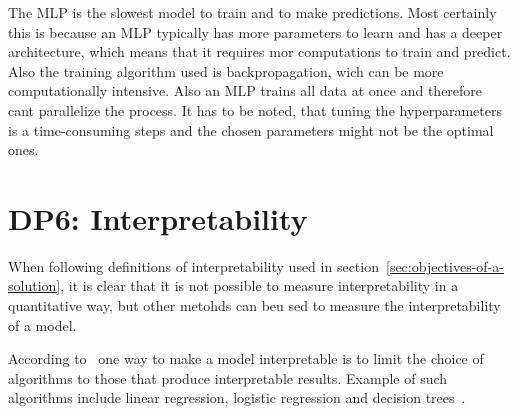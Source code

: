The \ac{MLP} is the slowest model to train and to make predictions.
Most certainly this is because an \ac{MLP} typically has more parameters to learn and
has a deeper architecture, which means that it requires mor computations to train and
predict.
Also the training algorithm used is backpropagation, wich can be more computationally
intensive.
Also an \ac{MLP} trains all data at once and therefore cant parallelize the process.
It has to be noted, that tuning the hyperparameters is a time-consuming steps and the
chosen parameters might not be the optimal ones.


\section{DP6: Interpretability}\label{sec:interpretability}

When following definitions of interpretability used in
section~\ref{sec:objectives-of-a-solution}, it is clear that it is not possible to
measure interpretability in a quantitative way, but other metohds can beu sed to measure the
interpretability of a model.


According to~\cite{molnar2020interpretable} one way to make a model interpretable is to limit the
choice of algorithms to those that produce interpretable results.
Example of such algorithms include linear regression, logistic regression and decision
trees~\cite[p. 35]{molnar2020interpretable}.


